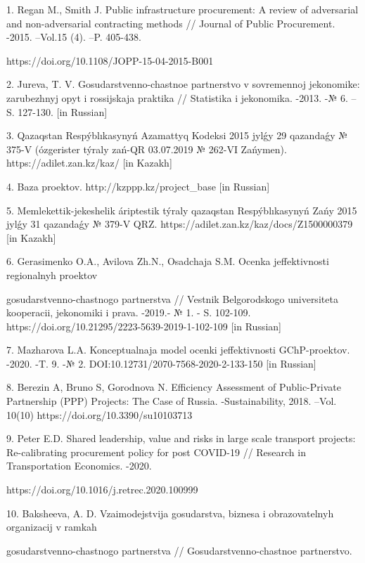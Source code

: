 \begin{noparindent}
1. Regan M., Smith J. Public infrastructure procurement: A review of
adversarial and non-adversarial contracting methods // Journal of Public
Procurement. -2015. --Vol.15 (4). --P. 405-438.

https://doi.org/10.1108/JOPP-15-04-2015-B001

2. Jur\textquotesingle eva, T. V. Gosudarstvenno-chastnoe partnerstvo v
sovremennoj jekonomike: zarubezhnyj opyt i rossijskaja praktika //
Statistika i jekonomika. -2013. -№ 6. --S. 127-130. {[}in Russian{]}

3. Qazaqstan Respýblıkasynyń Azamattyq Kodeksi 2015 jylǵy 29 qazandaǵy №
375-V (ózgerister týraly zań-QR 03.07.2019 № 262-VI Zańymen).
https://adilet.zan.kz/kaz/ {[}in Kazakh{]}

4. Baza proektov. http://kzppp.kz/project\_base {[}in Russian{]}

5. Memlekettik-jekeshelik áriptestik týraly qazaqstan Respýblıkasynyń
Zańy 2015 jylǵy 31 qazandaǵy № 379-V QRZ.
https://adilet.zan.kz/kaz/docs/Z1500000379 {[}in Kazakh{]}

6. Gerasimenko O.A., Avilova Zh.N., Osadchaja S.M. Ocenka jeffektivnosti
regional\textquotesingle nyh proektov

gosudarstvenno-chastnogo
partnerstva // Vestnik Belgorodskogo universiteta kooperacii, jekonomiki
i prava. -2019.- № 1. - S. 102-109.
https://doi.org/10.21295/2223-5639-2019-1-102-109 {[}in Russian{]}

7. Mazharova L.A. Konceptual\textquotesingle naja
model\textquotesingle{} ocenki jeffektivnosti GChP-proektov. -2020. -T.
9. -№ 2. DOI:10.12731/2070-7568-2020-2-133-150 {[}in Russian{]}

8. Berezin A, Bruno S, Gorodnova N. Efficiency Assessment of
Public-Private Partnership (PPP) Projects: The Case of Russia.
-Sustainability, 2018. --Vol. 10(10) https://doi.org/10.3390/su10103713

9. Peter E.D. Shared leadership, value and risks in large scale
transport projects: Re-calibrating procurement policy for post COVID-19
// Research in Transportation Economics. -2020.

https://doi.org/10.1016/j.retrec.2020.100999

10. Baksheeva, A. D. Vzaimodejstvija gosudarstva, biznesa i
obrazovatel\textquotesingle nyh organizacij v ramkah

gosudarstvenno-chastnogo partnerstva // Gosudarstvenno-chastnoe
partnerstvo.


\end{noparindent}
